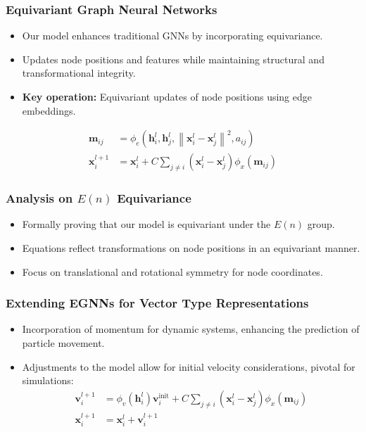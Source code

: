 \documentclass[11pt,xcolor={dvipsnames},hyperref={pdftex,pdfpagemode=UseNone,hidelinks,pdfdisplaydoctitle=true},usepdftitle=false]{beamer}
\newcommand{\rmm}{\mathbf{m}}
\newcommand{\rmh}{\mathbf{h}}
\newcommand{\rmx}{\mathbf{x}}
\newcommand{\rmv}{\mathbf{v}}
\begin{document}
\begin{frame}
\frametitle{Equivariant Graph Neural Networks}
\begin{itemize}
      \item Our model enhances traditional GNNs by incorporating equivariance.
      \item Updates node positions and features while maintaining structural and transformational integrity.
      \item \textbf{Key operation:} Equivariant updates of node positions using edge embeddings.
\end{itemize}
\begin{align}
\rmm_{ij} &=\phi_{e}\left(\rmh_{i}^{l}, \rmh_{j}^{l},\left\|\rmx_{i}^{l}-\rmx_{j}^{l}\right\|^{2}, a_{i j}\right) \\
\rmx_{i}^{l+1} &=\rmx_{i}^{l}+ C\sum_{j \neq i}\left(\rmx_{i}^{l}-\rmx_{j}^{l}\right) \phi_{x}\left(\rmm_{ij}\right)
\end{align}
\end{frame}

\begin{frame}
\frametitle{Analysis on $E(n)$ Equivariance}
\begin{itemize}
      \item Formally proving that our model is equivariant under the $E(n)$ group.
      \item Equations reflect transformations on node positions in an equivariant manner.
      \item Focus on translational and rotational symmetry for node coordinates.
\end{itemize}
\end{frame}

\begin{frame}
\frametitle{Extending EGNNs for Vector Type Representations}
\begin{itemize}
      \item Incorporation of momentum for dynamic systems, enhancing the prediction of particle movement.
      \item Adjustments to the model allow for initial velocity considerations, pivotal for simulations:
    \begin{align}
    \mathbf{v}_{i}^{l+1}&= \phi_{v}\left(\rmh_{i}^l\right)\rmv_{i}^\text{init} + C\sum_{j \neq i}\left(\mathbf{x}_{i}^{l}-\mathbf{x}_{j}^{l}\right) \phi_{x}\left(\mathbf{m}_{ij}\right) \\
    \rmx_{i}^{l+1} &=\mathbf{x}_{i}^{l}+ \mathbf{v}_i^{l+1}
    \end{align}
\end{itemize}
\end{frame}
\end{document}
